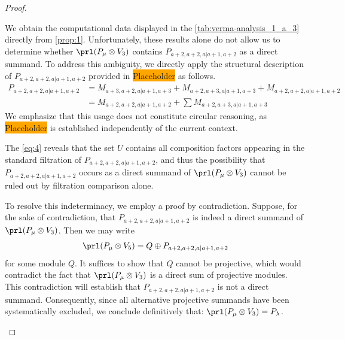 \begin{proof}
\begin{enumerate}
\begin{enumerate}
\begin{equation}
\end{equation}
We obtain the computational data displayed in the \cref{tab:verma-analysis_1_a_3} directly from \cref{prop:1}. Unfortunately, these results alone do not allow us to determine whether $\prl(P_\mu \otimes V_3)$ contains $P_{a+2,a+2,a|a+1,a+2}$ as a direct summand. To address this ambiguity, we directly apply the structural description of $P_{a+2,a+2,a|a+1,a+2}$ provided in \colorbox{orange}{Placeholder} as follows.
\begin{equation}\label{eq:4}
  \begin{aligned}
    P_{a+2,a+2,a|a+1,a+2} &=
M_{a+3,a+2,a|a+1,a+3}
+M_{a+2,a+3,a|a+1,a+3}
+M_{a+2,a+2,a|a+1,a+2}\\
                          &=
M_{a+2,a+2,a|a+1,a+2}
+\sum M_{a+2,a+3,a|a+1,a+3}
  \end{aligned}
\end{equation}
We emphasize that this usage does not constitute circular reasoning, as \colorbox{orange}{Placeholder} is established independently of the current context.

The \cref{eq:4} reveals that the set $U$ contains all composition factors appearing in the standard filtration of $P_{a+2,a+2,a|a+1,a+2}$, and thus the possibility that $P_{a+2,a+2,a|a+1,a+2}$ occurs as a direct summand of $\prl(P_\mu \otimes V_3)$ cannot be ruled out by filtration comparison alone.

To resolve this indeterminacy, we employ a proof by contradiction. Suppose, for the sake of contradiction, that $P_{a+2,a+2,a|a+1,a+2}$ is indeed a direct summand of $\prl(P_\mu \otimes V_3)$. Then we may write
\begin{equation}\notag
  \begin{aligned}
\prl(P_\mu \otimes V_5) = Q \oplus P_{a+2,a+2,a|a+1,a+2}
  \end{aligned}
\end{equation}
for some module $Q$. It suffices to show that $Q$ cannot be projective, which would contradict the fact that $\prl(P_\mu \otimes V_3)$ is a direct sum of projective modules. This contradiction will establish that $P_{a+2,a+2,a|a+1,a+2}$ is not a direct summand. Consequently, since all alternative projective summands have been systematically excluded, we conclude definitively that: $\prl(P_\mu \otimes V_3) = P_\lambda$.


\end{enumerate}
\end{enumerate}
\end{proof}

